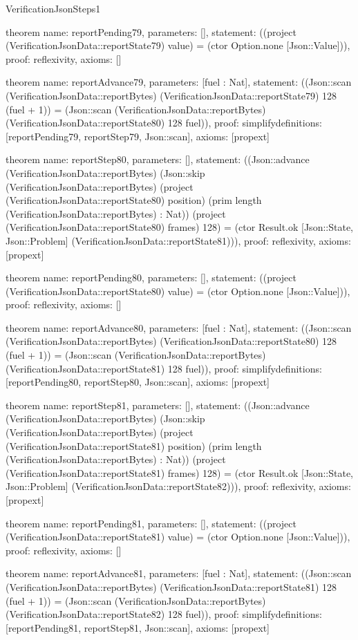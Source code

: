\begin{lexlean}{VerificationJsonSteps1}
\begin{semanticmodule}
theorem{
  name: reportPending79,
  parameters: [],
  statement: ((project (VerificationJsonData::reportState79) value) = (ctor Option.none [Json::Value])),
  proof: reflexivity{},
  axioms: []
}

theorem{
  name: reportAdvance79,
  parameters: [fuel : Nat],
  statement: ((Json::scan (VerificationJsonData::reportBytes) (VerificationJsonData::reportState79) 128 (fuel + 1)) = (Json::scan (VerificationJsonData::reportBytes) (VerificationJsonData::reportState80) 128 fuel)),
  proof: simplify{definitions: [reportPending79, reportStep79, Json::scan]},
  axioms: [propext]
}

theorem{
  name: reportStep80,
  parameters: [],
  statement: ((Json::advance (VerificationJsonData::reportBytes) (Json::skip (VerificationJsonData::reportBytes) (project (VerificationJsonData::reportState80) position) (prim length (VerificationJsonData::reportBytes) : Nat)) (project (VerificationJsonData::reportState80) frames) 128) = (ctor Result.ok [Json::State, Json::Problem] (VerificationJsonData::reportState81))),
  proof: reflexivity{},
  axioms: [propext]
}

theorem{
  name: reportPending80,
  parameters: [],
  statement: ((project (VerificationJsonData::reportState80) value) = (ctor Option.none [Json::Value])),
  proof: reflexivity{},
  axioms: []
}

theorem{
  name: reportAdvance80,
  parameters: [fuel : Nat],
  statement: ((Json::scan (VerificationJsonData::reportBytes) (VerificationJsonData::reportState80) 128 (fuel + 1)) = (Json::scan (VerificationJsonData::reportBytes) (VerificationJsonData::reportState81) 128 fuel)),
  proof: simplify{definitions: [reportPending80, reportStep80, Json::scan]},
  axioms: [propext]
}

theorem{
  name: reportStep81,
  parameters: [],
  statement: ((Json::advance (VerificationJsonData::reportBytes) (Json::skip (VerificationJsonData::reportBytes) (project (VerificationJsonData::reportState81) position) (prim length (VerificationJsonData::reportBytes) : Nat)) (project (VerificationJsonData::reportState81) frames) 128) = (ctor Result.ok [Json::State, Json::Problem] (VerificationJsonData::reportState82))),
  proof: reflexivity{},
  axioms: [propext]
}

theorem{
  name: reportPending81,
  parameters: [],
  statement: ((project (VerificationJsonData::reportState81) value) = (ctor Option.none [Json::Value])),
  proof: reflexivity{},
  axioms: []
}

theorem{
  name: reportAdvance81,
  parameters: [fuel : Nat],
  statement: ((Json::scan (VerificationJsonData::reportBytes) (VerificationJsonData::reportState81) 128 (fuel + 1)) = (Json::scan (VerificationJsonData::reportBytes) (VerificationJsonData::reportState82) 128 fuel)),
  proof: simplify{definitions: [reportPending81, reportStep81, Json::scan]},
  axioms: [propext]
}


\end{semanticmodule}
\end{lexlean}
